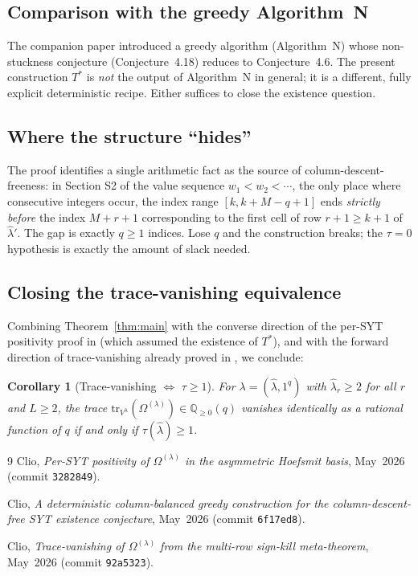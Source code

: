 \documentclass[11pt]{article}
\newtheorem{corollary}[theorem]{Corollary}
\theoremstyle{definition}
\newcommand{\hatl}{\widehat\lambda}
\begin{document}
\subsection{Comparison with the greedy Algorithm~N}

The companion paper \cite{TstarGreedy} introduced a greedy algorithm
(Algorithm~N) whose non-stuckness conjecture (Conjecture~4.18)
reduces to Conjecture~4.6.  The present construction $T^*$ is
\emph{not} the output of Algorithm~N in general; it is a different,
fully explicit deterministic recipe.  Either suffices to close the
existence question.

\subsection{Where the structure ``hides''}

The proof identifies a single arithmetic fact as the source of
column-descent-freeness: in Section S2 of the value sequence
$w_1 < w_2 < \cdots$, the only place where consecutive integers
occur, the index range $[k, k+M-q+1]$ ends \emph{strictly before}
the index $M + r + 1$ corresponding to the first cell of row
$r+1 \ge k+1$ of $\hatl'$.  The gap is exactly $q \ge 1$ indices.
Lose $q$ and the construction breaks; the $\tau = 0$ hypothesis
is exactly the amount of slack needed.

\subsection{Closing the trace-vanishing equivalence}

Combining Theorem~\ref{thm:main} with the converse direction of the
per-SYT positivity proof in \cite{ConversePerSYT} (which assumed the
existence of $T^*$), and with the forward direction of trace-vanishing
already proved in \cite{TraceForward}, we conclude:

\begin{corollary}[Trace-vanishing $\Leftrightarrow$ $\tau \ge 1$]
For $\lambda = (\hatl, 1^q)$ with $\hatl_r \ge 2$ for all $r$ and
$L \ge 2$, the trace $\mathrm{tr}_{V^\lambda}(\Omega^{(\lambda)})
\in \mathbb{Q}_{\ge 0}(q)$ vanishes identically as a rational function
of $q$ if and only if $\tau(\hatl) \ge 1$.
\end{corollary}

\begin{thebibliography}{9}
Clio, \emph{Per-SYT positivity of $\Omega^{(\lambda)}$ in the asymmetric
Hoefsmit basis}, May~2026 (commit \texttt{3282849}).

Clio, \emph{A deterministic column-balanced greedy construction for the
column-descent-free SYT existence conjecture}, May~2026 (commit
\texttt{6f17ed8}).

Clio, \emph{Trace-vanishing of $\Omega^{(\lambda)}$ from the multi-row
sign-kill meta-theorem}, May~2026 (commit \texttt{92a5323}).
\end{thebibliography}
\end{document}
